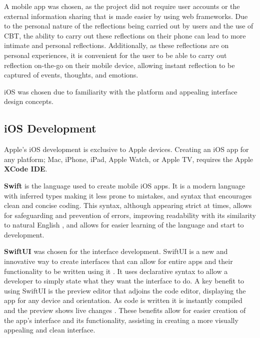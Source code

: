 \documentclass{l4proj}
\begin{document}
A mobile app was chosen, as the project did not require user accounts or the external information sharing that is made easier by using web frameworks. Due to the personal nature of the reflections being carried out by users and the use of CBT, the ability to carry out these reflections on their phone can lead to more intimate and personal reflections. Additionally, as these reflections are on personal experiences, it is convenient for the user to be able to carry out reflection on-the-go on their mobile device, allowing instant reflection to be captured of events, thoughts, and emotions. 

iOS was chosen due to familiarity with the platform and appealing interface design concepts.

\subsection{iOS Development}

Apple's iOS development is exclusive to Apple devices. Creating an iOS app for any platform; Mac, iPhone, iPad, Apple Watch, or Apple TV, requires the Apple \textbf{XCode IDE}. 

\textbf{Swift} is the language used to create mobile iOS apps. It is a modern language with inferred types making it less prone to mistakes, and syntax that encourages clean and concise coding. This syntax, although appearing strict at times, allows for safeguarding and prevention of errors, improving readability with its similarity to natural English \citep{altexsoft_swift_2021}, and allows for easier learning of the language and start to development.

\textbf{SwiftUI} was chosen for the interface development. SwiftUI is a new and innovative way to create interfaces that can allow for entire apps and their functionality to be written using it \citep{apple_developer_xcode_2021}. It uses declarative syntax to allow a developer to simply state what they want the interface to do. A key benefit to using SwiftUI is the preview editor that adjoins the code editor, displaying the app for any device and orientation. As code is written it is instantly compiled and the preview shows live changes \citep{apple_swiftui_2021}. These benefits allow for easier creation of the app's interface and its functionality, assisting in creating a more visually appealing and clean interface.


\end{document}
